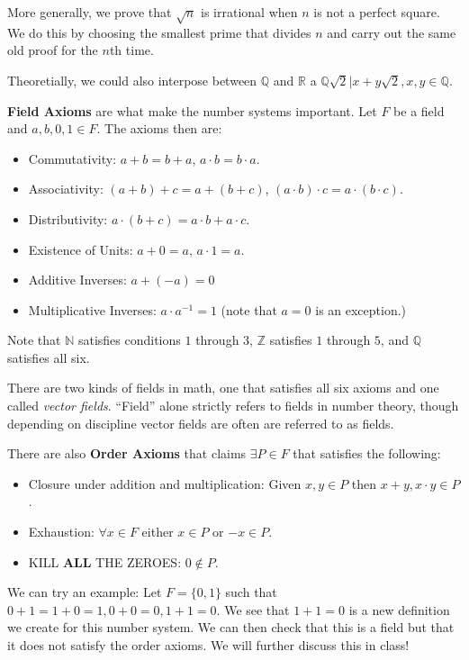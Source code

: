 \documentclass{report}
\begin{document}
More generally, we prove that $\sqrt{n}$ is irrational when $n$ is not a perfect square. We do this by choosing the smallest prime that divides $n$ and carry out the same old proof for the $n$th time.

Theoretially, we could also interpose between $\mathbb{Q}$ and $\mathbb{R}$ a $\mathbb{Q} \sqrt{2} | x + y \sqrt{2}, x,y \in \mathbb{Q}$. 

\textbf{Field Axioms} are what make the number systems important. Let $F$ be a field and $a, b,0,1 \in F$. The axioms then are:

\begin{itemize}
\item Commutativity: $a+b = b+a$, $a \cdot b = b \cdot a$.
\item Associativity: $(a + b) + c = a + (b + c)$, $(a \cdot b) \cdot c = a \cdot (b \cdot c)$. 
\item Distributivity: $a \cdot (b + c) = a \cdot b + a \cdot c$.
\item Existence of Units: $a + 0 = a$, $a \cdot 1 = a$.
\item Additive Inverses: $a + (-a) = 0$
\item Multiplicative Inverses: $a \cdot a^{-1} = 1$ (note that $a = 0$ is an exception.)
\end{itemize}

Note that $\mathbb{N}$ satisfies conditions $1$ through $3$, $\mathbb{Z}$ satisfies $1$ through $5$, and $\mathbb{Q}$ satisfies all six.

There are two kinds of fields in math, one that satisfies all six axioms and one called \emph{vector fields}. "`Field"' alone strictly refers to fields in number theory, though depending on discipline vector fields are often are referred to as fields.

There are also \textbf{Order Axioms} that claims $\exists P \in F$ that satisfies the following:

\begin{itemize}
\item Closure under addition and multiplication: Given $x,y \in P$ then $x+y, x\cdot y \in P$.
\item Exhaustion: $\forall x \in F$ either $x \in P$ or $-x \in P$.
\item KILL \textbf{ALL} THE ZEROES: $0 \notin P$.
\end{itemize}

We can try an example: Let $F = \{0,1\}$ such that $0+1 = 1+0 = 1, 0+0 = 0, 1+1 = 0$. We see that $1+1=0$ is a new definition we create for this number system. We can then check that this is a field but that it does not satisfy the order axioms. We will further discuss this in class!
\end{document}
